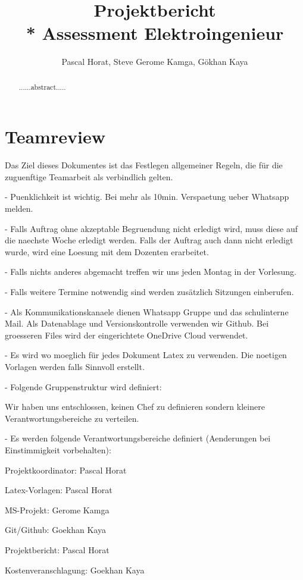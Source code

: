 \documentclass[10pt]{article}
\title{Projektbericht\\* Assessment Elektroingenieur}
\author{Pascal Horat, Steve Gerome Kamga, Gökhan Kaya}
\begin{document}
\maketitle

\begin{abstract}
......abstract.....
\end{abstract}

\tableofcontents

\section{Teamreview}

Das Ziel dieses Dokumentes ist das Festlegen allgemeiner Regeln, die für die zuguenftige Teamarbeit als verbindlich gelten.

- Puenklichkeit ist wichtig. Bei mehr als 10min. Verspaetung ueber Whatsapp melden. 

- Falls Auftrag ohne akzeptable Begruendung nicht erledigt wird, muss diese auf die naechste Woche erledigt werden. Falls der Auftrag auch dann nicht erledigt wurde, wird eine Loesung mit dem Dozenten erarbeitet.

- Falls nichts anderes abgemacht treffen wir uns jeden Montag in der Vorlesung.

- Falls weitere Termine notwendig sind werden zusätzlich Sitzungen einberufen.

- Als Kommunikationskanaele dienen Whatsapp Gruppe und das schulinterne Mail. Als Datenablage und Versionskontrolle verwenden wir Github. Bei groesseren Files wird der eingerichtete OneDrive Cloud verwendet.

- Es wird wo moeglich für jedes Dokument Latex zu verwenden. Die noetigen Vorlagen werden falls Sinnvoll erstellt.

- Folgende Gruppenstruktur wird definiert:

Wir haben uns entschlossen, keinen Chef zu definieren sondern kleinere Verantwortungsbereiche zu verteilen.

- Es werden folgende Verantwortungsbereiche definiert (Aenderungen bei Einstimmigkeit vorbehalten):

Projektkoordinator: Pascal Horat

Latex-Vorlagen: Pascal Horat

MS-Projekt: Gerome Kamga

Git/Github: Goekhan Kaya

Projektbericht: Pascal Horat

Kostenveranschlagung: Goekhan Kaya
\end{document}
